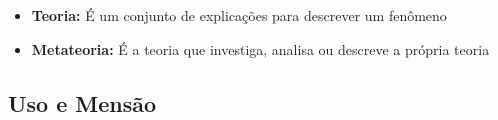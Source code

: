 \begin{itemize}[left=0.5cm, align=left, nosep]
\begin{center}
                \end{center}

                \vspace{-0.3cm}

                Exemplo: $2 + 2 = 4$ \\
                \textbf{Linguagem-objeto:} “$2 + 2 = 4$” — uma sentença da linguagem da \emph{aritmética}. \\
                \textbf{Metaliguagem:} “A expressão ‘$2 + 2 = 4$’ é verdadeira.” — frase na linguagem natural (Português) 
                    descrevendo a sentença da linguagem-objeto. \\
                \textbf{Metametalinguagem:} “A frase ‘A expressão $2 + 2 = 4$ é verdadeira’ é uma afirmação correta 
                    sobre a linguagem da aritmética.” — análise sobre a metalinguagem.
            
                \item \textbf{Teoria:} É um conjunto de explicações para descrever um fenômeno
                \item \textbf{Metateoria:} É a teoria que investiga, analisa ou descreve a própria teoria
            
            \end{itemize}
       
    \subsection{Uso e Mensão}
        

